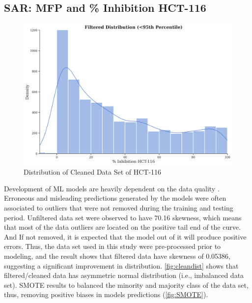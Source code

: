 \subsection*{SAR: MFP and \% Inhibition HCT-116}
\begin{figure}[htbp] %
    \centering
    \hspace{-1cm}
    \includegraphics[scale=0.5]{cleandatadist.png}%
    \caption{Distribution of Cleaned Data Set of HCT-116}
    \label{fig:cleandist} %
\end{figure}

Development of ML models are heavily dependent on the data quality \cite{zhou2024dataquality}. Erroneous and misleading predictions generated by the models were often associated to outliers that were not removed during the training and testing period. Unfiltered data set were observed to have 70.16 skewness, which means that most of the data outliers are located on the positive tail end of the curve. And If not removed, it is expected that the model out of it will produce positive errors. Thus, the data set used in this study were pre-processed prior to modeling, and the result shows that filtered data have skewness of 0.05386, suggesting a significant improvement in distribution. \autoref{fig:cleandist} shows that filtered/cleaned data has asymmetric normal distribution (i.e., imbalanced data set). SMOTE results to balanced the minority and majority class of the data set, thus, removing positive biases in models predictions (\autoref{fig:SMOTE}).

